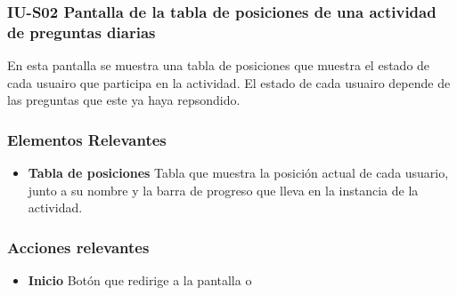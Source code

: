
\subsubsection{IU-S02  Pantalla de la tabla de posiciones de una actividad de preguntas diarias}

 En esta pantalla se muestra una tabla de posiciones que muestra el estado de cada usuairo que participa en la actividad.
 El estado de cada usuairo depende de las preguntas que este ya haya repsondido.


\subsubsection{Elementos Relevantes}

    \begin{itemize}
    \item {\bf Tabla de posiciones}
        Tabla que muestra la posición actual de cada usuario, junto a su nombre y la barra de progreso que lleva en la instancia de la actividad.
    \end{itemize}

\subsubsection{Acciones relevantes}

    \begin{itemize}
    \item {\bf Inicio}
        Botón que redirige a la pantalla  o 
    \end{itemize}

\clearpage
